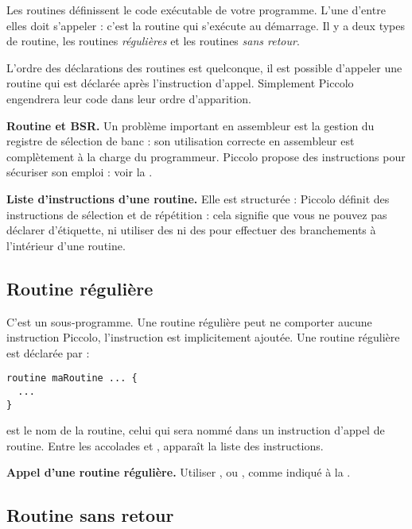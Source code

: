 
Les routines définissent le code exécutable de votre programme. L’une d’entre elles doit s’appeler  : c’est la routine qui s’exécute au démarrage. Il y a deux types de routine, les routines \emph{régulières} et les routines \emph{sans retour}.


L’ordre des déclarations des routines est quelconque, il est possible d’appeler une routine qui est déclarée après l’instruction d’appel. Simplement Piccolo engendrera leur code dans leur ordre d’apparition. 

\textbf{Routine et BSR.} Un problème important en assembleur est la gestion du registre de sélection de banc  : son utilisation correcte en assembleur est complètement à la charge du programmeur. Piccolo propose des instructions pour sécuriser son emploi : voir la .

\textbf{Liste d’instructions d’une routine.} Elle est structurée : Piccolo définit des instructions de sélection et de répétition : cela signifie que vous ne pouvez pas déclarer d’étiquette, ni utiliser des  ni des  pour effectuer des branchements à l’intérieur d’une routine.


\subsection{Routine régulière}

C'est un sous-programme. Une routine régulière peut ne comporter aucune instruction Piccolo, l'instruction  est implicitement ajoutée. Une routine régulière est déclarée par :
\begin{lstlisting}[language=piccolo]
routine maRoutine ... {
  ...
}
\end{lstlisting}

 est le nom de la routine, celui qui sera nommé dans un instruction d’appel de routine. Entre les accolades \piccolo{\{} et \piccolo{\}}, apparaît la liste des instructions.

\textbf{Appel d’une routine régulière.} Utiliser ,  ou , comme indiqué à la .

\subsection{Routine sans retour}

